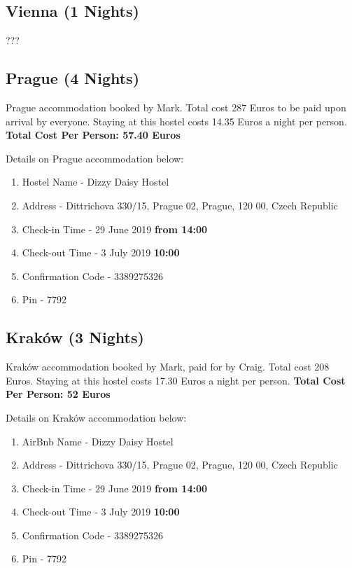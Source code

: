 \documentclass[a4paper,12pt]{article}
\begin{document}
    \subsection*{Vienna (1 Nights)}
    
    ??? \newline
    \newpage
    
    \subsection*{Prague (4 Nights)}
    Prague accommodation booked by Mark. Total cost 287 Euros to be paid upon arrival by everyone. Staying at this hostel costs 14.35 Euros a night per person. \textbf{Total Cost Per Person: 57.40 Euros}\newline
    
    \noindent Details on Prague accommodation below:
    
    \begin{enumerate}
    	\item Hostel Name - Dizzy Daisy Hostel
    	\item Address - Dittrichova 330/15, Prague 02, Prague, 120 00, Czech Republic 
    	\item Check-in Time - 29 June 2019 \textbf{from 14:00}
    	\item Check-out Time - 3 July 2019 \textbf{10:00}
    	\item Confirmation Code -   3389275326 
   		\item Pin - 7792\newline
   		 \end{enumerate}
   	 
   \subsection*{Kraków (3 Nights)}
    Kraków accommodation booked by Mark, paid for by Craig. Total cost 208 Euros. Staying at this hostel costs 17.30 Euros a night per person. \textbf{Total Cost Per Person: 52 Euros}\newline
    
      \noindent Details on Kraków accommodation below:
    
    \begin{enumerate}
    	\item AirBnb Name - Dizzy Daisy Hostel
    	\item Address - Dittrichova 330/15, Prague 02, Prague, 120 00, Czech Republic 
    	\item Check-in Time - 29 June 2019 \textbf{from 14:00}
    	\item Check-out Time - 3 July 2019 \textbf{10:00}
    	\item Confirmation Code -   3389275326 
    	\item Pin - 7792\newline
    \end{enumerate}
\end{document}
